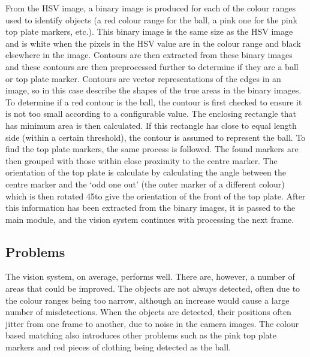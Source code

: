 From the HSV image, a binary image is produced for each of the colour ranges
used to identify objects (a red colour range for the ball, a pink one for the
pink top plate markers, etc.). This binary image is the same size as the HSV
image and is white when the pixels in the HSV value are in the colour range and
black elsewhere in the image.  Contours are then extracted from these binary
images and these contours are then preprocessed further to determine if they
are a ball or top plate marker.  Contours are vector representations of the
edges in an image, so in this case describe the shapes of the true areas in the
binary images. To determine if a red contour is the ball, the contour is first
checked to ensure it is not too small according to a configurable value. The
enclosing rectangle that has minimum area is then calculated. If this rectangle
has close to equal length side (within a certain threshold), the contour is
assumed to represent the ball. To find the top plate markers, the same process
is followed. The found markers are then grouped with those within close
proximity to the centre marker. The orientation of the top plate is calculate
by calculating the angle between the centre marker and the `odd one out' (the
outer marker of a different colour) which is then rotated 45\degree to give the
orientation of the front of the top plate.  After this information has been
extracted from the binary images, it is passed to the main module, and the
vision system continues with processing the next frame.

\subsection{Problems}

The vision system, on average, performs well. There are, however, a number of
areas that could be improved. The objects are not always detected, often due to
the colour ranges being too narrow, although an increase would cause a large
number of misdetections. When the objects are detected, their positions often
jitter from one frame to another, due to noise in the camera images. The colour
based matching also introduces other problems such as the pink top plate
markers and red pieces of clothing being detected as the ball.
